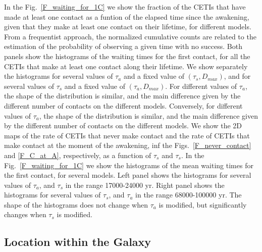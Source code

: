 \documentclass[crop]{CSLB}%
\begin{document}
In the Fig.~\ref{F_waiting_for_1C} we show the fraction of the CETIs
that have made at least one contact as a funtion of the elapsed time
since the awakening, given that they make at least one contact on
their lifetime, for different models.
%
From a frequentist approach, the normalized cumulative counts are
related to the estimation of the probability of observing a given time
with no success.
%             
Both panels show the histograms of the waiting times for the first
contact, for all the CETIs that make at least one contact along their
lifetime.
%
We show separately the histograms for several values of $\tau_a$ and a
fixed value of $(\tau_s, D_{max})$, and for several values of $\tau_s$
and a fixed value of $(\tau_a, D_{max})$.
%
For different values of $\tau_a$, the shape of the distribution is
similar, and the main difference given by the different number of
contacts on the different models.
%
Conversely, for different values of $\tau_a$, the shape of the
distribution is similar, and the main difference given by the
different number of contacts on the different models. 
%
We show the 2D maps of the rate of CETIs that never make contact and
the rate of CETIs that make contact at the moment of the awakening,
inf the Figs.~\ref{F_never_contact} and \ref{F_C_at_A}, respectively,
as a function of $\tau_s$ and $\tau_s$.
%
In the Fig.~\ref{F_waiting_for_1C} we show the histograms of the mean
waiting times for the first contact, for several models.
%
Left panel shows the histograms for several values of $\tau_a$, and
$\tau_s$ in the range 17000-24000 yr.
%
Right panel shows the histograms for several values of $\tau_s$, and
$\tau_a$ in the range 68000-100000 yr.
%
The shape of the histograms does not change when $\tau_a$ is modified,
but significantly changes when $\tau_s$ is modified.


                   
           

\subsection{Location within the Galaxy}\label{SS_location}
    
\end{document}
